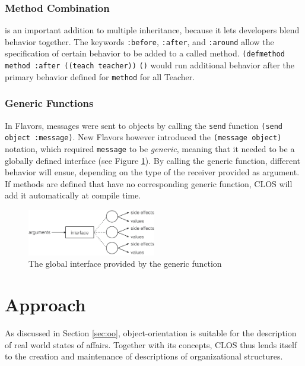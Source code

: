 \documentclass[oribibl]{llncs}
\begin{document}
\subsubsection{Method Combination}
\label{sec:metcom}
is an important addition to multiple inheritance, because it lets developers blend behavior together. The keywords \texttt{:before}, \texttt{:after}, and \texttt{:around} allow the specification of certain behavior to be added to a called method. \texttt{(defmethod method :after}\texttt{ ((teach teacher))}
    \texttt{()} would run additional behavior after the primary behavior defined for \texttt{method} for all Teacher. 


\subsubsection{Generic Functions}
\label{sec:genfun}
In Flavors, messages were sent to objects by calling the \texttt{send} function \texttt{(send object :message)}. New Flavors however introduced the \texttt{(message object)} notation, which required \texttt{message} to be \emph{generic}, meaning that it needed to be a globally defined interface (see Figure \ref{fig:genericfunction}). By calling the generic function, different behavior will ensue, depending on the type of the receiver provided as argument. If methods are defined that have no corresponding generic function, CLOS will add it automatically at compile time.


\begin{figure}[]
    \centering
    \includegraphics[width=0.5\textwidth]{images/genericfunction.png}
    \caption{The global interface provided by the generic function}
    \label{fig:genericfunction}
\end{figure}

\section{Approach}
\label{sec:approach}

As discussed in Section \ref{sec:oo}, object-orientation is suitable for the description of real world states of affairs. Together with its concepts, CLOS thus lends itself to the creation and maintenance of descriptions of organizational structures.
\end{document}
